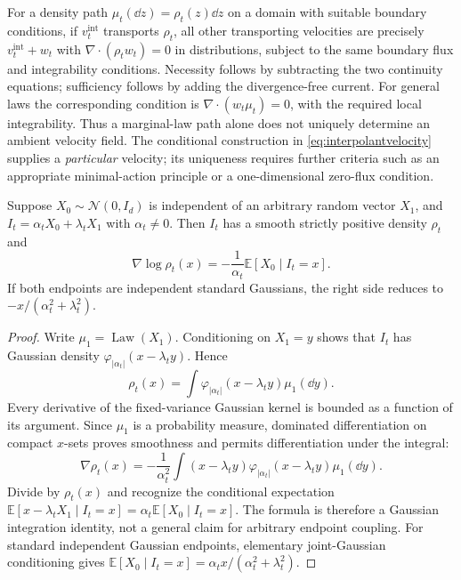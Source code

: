 \documentclass[12pt,a4paper,oneside]{book}
\begin{document}
\begin{remark}
For a density path $\mu_t(\dd z)=\rho_t(z)\dd z$ on a domain with
suitable boundary conditions, if $v_t^{\mathrm{int}}$ transports $\rho_t$, all other transporting velocities are precisely $v_t^{\mathrm{int}}+w_t$ with
$\nabla\cdot(\rho_tw_t)=0$ in distributions, subject to the same
boundary flux and integrability conditions. Necessity follows by
subtracting the two continuity equations; sufficiency follows by adding
the divergence-free current.
For general laws the corresponding condition is
$\nabla\cdot(w_t\mu_t)=0$, with the required local integrability.
Thus a marginal-law path alone does not uniquely determine an ambient
velocity field. The conditional construction in
\eqref{eq:interpolantvelocity} supplies a \emph{particular} velocity;
its uniqueness requires further criteria such as an appropriate
minimal-action principle or a one-dimensional zero-flux condition.
\end{remark}


\begin{proposition}
\label{prop:interpolant-score}
\label{src:p14q3}
Suppose $X_0\sim\mathcal N(0,I_d)$ is independent of an arbitrary
random vector $X_1$, and $I_t=\alpha_tX_0+\lambda_tX_1$ with
$\alpha_t\ne0$. Then $I_t$ has a smooth strictly positive density
$\rho_t$ and
\begin{equation*}
\nabla\log\rho_t(x)
=-\frac1{\alpha_t}\mathbb E[X_0\mid I_t=x].
\end{equation*}
If both endpoints are independent standard Gaussians, the right side
reduces to $-x/(\alpha_t^2+\lambda_t^2)$.
\end{proposition}
\begin{proof}
Write $\mu_1=\operatorname{Law}(X_1)$. Conditioning on $X_1=y$
shows that $I_t$ has Gaussian density
$\varphi_{|\alpha_t|}(x-\lambda_ty)$. Hence
\begin{equation*}
\rho_t(x)=\int\varphi_{|\alpha_t|}(x-\lambda_ty)\mu_1(\dd y).
\end{equation*}
Every derivative of the fixed-variance Gaussian kernel is bounded
as a function of its argument. Since $\mu_1$ is a probability measure,
dominated differentiation on compact $x$-sets proves smoothness and
permits differentiation under the integral:
\begin{equation*}
\nabla\rho_t(x)=-\frac1{\alpha_t^2}
\int(x-\lambda_ty)\varphi_{|\alpha_t|}(x-\lambda_ty)
\mu_1(\dd y).
\end{equation*}
Divide by $\rho_t(x)$ and recognize the conditional expectation
$\mathbb E[x-\lambda_tX_1\mid I_t=x]=
\alpha_t\mathbb E[X_0\mid I_t=x]$.
The formula is therefore a Gaussian integration identity, not a
general claim for arbitrary endpoint coupling. For standard independent
Gaussian endpoints, elementary joint-Gaussian conditioning gives
$\mathbb E[X_0\mid I_t=x]=\alpha_tx/(
\alpha_t^2+\lambda_t^2)$.
\end{proof}
\end{document}

